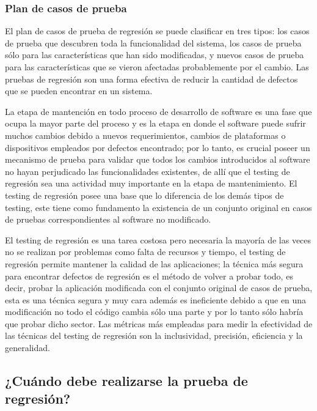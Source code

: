 \documentclass[conference]{IEEEtran}
\begin{document}
\subsubsection{Plan de casos de prueba}
 
 El plan de casos de prueba de regresión se puede clasificar en tres tipos: los casos de prueba que descubren toda la funcionalidad del sistema, los casos de prueba sólo para las características que han sido modificadas, y nuevos casos de prueba para las características que se vieron afectadas probablemente por el cambio. Las pruebas de regresión son una forma efectiva de reducir la cantidad de defectos que se pueden encontrar en un sistema.


 La etapa de mantención en todo proceso de desarrollo de software es una fase que ocupa la mayor parte del proceso y es la etapa en donde el software puede sufrir muchos cambios debido a nuevos requerimientos, cambios de plataformas o dispositivos empleados por defectos encontrado; por lo tanto, es crucial poseer un mecanismo de prueba para validar que todos los cambios introducidos al software no hayan perjudicado las funcionalidades existentes, de allí que el testing de regresión sea una actividad muy importante en la etapa de mantenimiento. El testing de regresión posee una base que lo diferencia de los demás tipos de testing, este tiene como fundamento la existencia de un conjunto original en casos de pruebas correspondientes al software no modificado. 
 
El testing de regresión es una tarea costosa pero necesaria la mayoría de las veces no se realizan por problemas como falta de recursos y tiempo, el testing de regresión permite mantener la calidad de las aplicaciones; la técnica más segura para encontrar defectos de regresión es el método de volver a probar todo, es decir, probar la aplicación modificada con el conjunto original de casos de prueba, esta es una técnica segura y muy cara además es ineficiente debido a que en una modificación no todo el código cambia sólo una parte y por lo tanto sólo habría que probar dicho sector. Las métricas más empleadas para medir la efectividad de las técnicas del testing de regresión son la inclusividad, precisión, eficiencia y  la generalidad. 




\subsection{¿Cuándo debe realizarse la prueba de regresión?}
\end{document}
